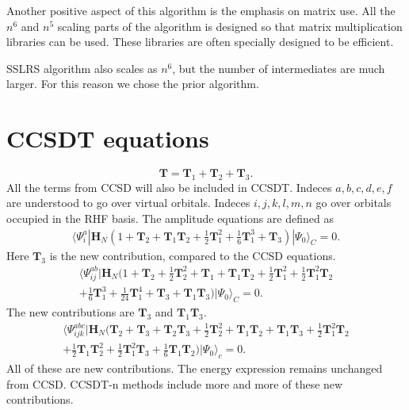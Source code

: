 \documentclass[graybox,sectrefs,envcountresetchap,open=right]{svmonodo}
\begin{document}
Another positive aspect of this algorithm is the emphasis on matrix use. All the $n^6$ and $n^5$ scaling parts of the algorithm is designed so that matrix multiplication libraries can be used. These libraries are often specially designed to be efficient.

SSLRS algorithm also scales as $n^6$, but the number of intermediates are much larger. For this reason we chose the prior algorithm.




\section{CCSDT equations}

\begin{equation} \mathbf{T} = \mathbf{T}_1 + \mathbf{T}_2 +
\mathbf{T}_3 .  
\end{equation} 
All the terms from CCSD will also
be included in CCSDT. Indeces $a,b,c,d,e,f$ are understood to go over
virtual orbitals. Indeces $i,j,k,l,m,n$ go over orbitals occupied in the
RHF basis. The amplitude equations are defined as 
\begin{align}
\langle \Psi_i^a | \mathbf{H}_N (1 + \mathbf{T}_2 + \mathbf{T}_1
\mathbf{T}_2 + \frac{1}{2} \mathbf{T}_1^2 + \frac{1}{6} \mathbf{T}_1^3
+ \mathbf{T}_3) | \Psi_0 \rangle_C = 0.  
\end{align} 
Here
$\mathbf{T}_3$ is the new contribution, compared to the CCSD
equations.  
\begin{align} \langle \Psi_{ij}^{ab} | \mathbf{H}_N (
1 + \mathbf{T}_2 + \frac{1}{2} \mathbf{T}_2^2 + \mathbf{T}_1 +
\mathbf{T}_1 \mathbf{T}_2 + \frac{1}{2} \mathbf{T}_1^2 + \frac{1}{2}
\mathbf{T}_1^2 \mathbf{T}_2 \nonumber \\ + \frac{1}{6} \mathbf{T}_1^3
+ \frac{1}{24} \mathbf{T}_1^4 + \mathbf{T}_3 + \mathbf{T}_1
\mathbf{T}_3) | \Psi_0 \rangle_C = 0.  
\end{align} 
The new
contributions are $\mathbf{T}_3$ and $\mathbf{T}_1 \mathbf{T}_3$.  
\begin{align} \langle \Psi_{ijk}^{abc} | \mathbf{H}_N ( \mathbf{T}_2 +
\mathbf{T}_3 + \mathbf{T}_2 \mathbf{T}_3 + \frac{1}{2} \mathbf{T}_2^2
+ \mathbf{T}_1 \mathbf{T}_2 + \mathbf{T}_1 \mathbf{T}_3 + \frac{1}{2}
\mathbf{T}_1^2 \mathbf{T}_2 \nonumber \\ + \frac{1}{2} \mathbf{T}_1
\mathbf{T}_2^2 + \frac{1}{2} \mathbf{T}_1^2 \mathbf{T}_3 + \frac{1}{6}
\mathbf{T}_1 \mathbf{T}_2) | \Psi_0 \rangle_c = 0.  
\end{align} 
All of these are new contributions. The energy expression remains
unchanged from CCSD. CCSDT-n methods include more and more of these
new contributions.
\end{document}
